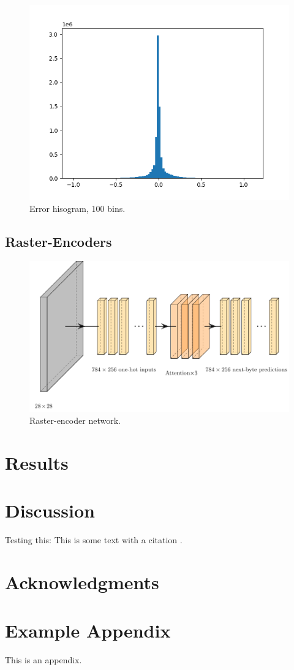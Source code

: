 \documentclass[11pt]{article}
\begin{document}
\begin{figure}[h]
  \centering
  \includegraphics[width=\columnwidth]{diagrams/hist.png}
  \caption{Error hisogram, 100 bins.}
  \label{fig:hist}
\end{figure}

\subsection{Raster-Encoders}

\begin{figure}[t]
  \centering
  \includegraphics[width=2\columnwidth]{diagrams/raster.pdf}
  \caption{Raster-encoder network.}
  \label{fig:raster}
\end{figure}



\section{Results}


\section{Discussion}

Testing this: This is some text with a citation \citep{lazaridou-etal-2020-multi}.

\section*{Acknowledgments}



\appendix

\section{Example Appendix}
\label{sec:appendix}

This is an appendix.
\end{document}
